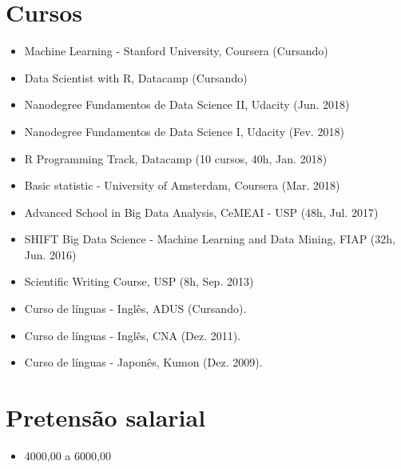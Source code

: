 \documentclass[letterpaper]{twentysecondcv} %
\begin{document}
\section{Cursos}
\begin{itemize}
	\item Machine Learning - Stanford University, Coursera (Cursando)
	\item Data Scientist with R, Datacamp (Cursando)
	\item Nanodegree Fundamentos de Data Science II, Udacity (Jun. 2018)
	\item Nanodegree Fundamentos de Data Science I, Udacity (Fev. 2018)
	\item R Programming Track, Datacamp (10 cursos, 40h, Jan. 2018)
	\item Basic statistic - University of Amsterdam, Coursera (Mar. 2018)
	\item Advanced School in Big Data Analysis, CeMEAI - USP (48h, Jul. 2017)
	\item SHIFT Big Data Science - Machine Learning and Data Mining, FIAP (32h, Jun. 2016)
	\item Scientific Writing Course, USP (8h, Sep. 2013)
	\item Curso de línguas - Inglês, ADUS (Cursando).
	\item Curso de línguas - Inglês, CNA (Dez. 2011).
	\item Curso de línguas - Japonês, Kumon (Dez. 2009).
\end{itemize}

\section{Pretensão salarial}
\begin{itemize}
	\item 4000,00 a 6000,00
\end{itemize}
\end{document}
